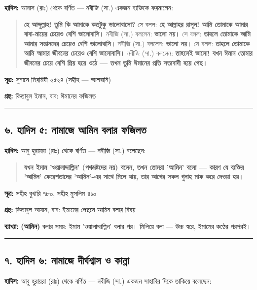 \textbf{হাদিস:} আনাস (রাঃ) থেকে বর্ণিত — নবীজি (সা.) একজন ব্যক্তিকে ফরমালেন:

\begin{quote}
\textbf{হে আব্দুল্লাহ! তুমি কি আমাকে কতটুকু ভালোবাসো?} সে বলল: \textbf{হে আল্লাহর রাসূল! আমি তোমাকে আমার বাবা-মায়ের চেয়েও বেশি ভালোবাসি।} নবীজি (সা.) বললেন: \textbf{ভালো নয়।} সে বলল: \textbf{তাহলে তোমাকে আমি আমার সন্তানদের চেয়েও বেশি ভালোবাসি।} নবীজি (সা.) বললেন: \textbf{ভালো নয়।} সে বলল: \textbf{তাহলে তোমাকে আমি আমার জীবনের চেয়েও বেশি ভালোবাসি।} নবীজি (সা.) বললেন: \textbf{তাহলেই ভালো! যখন ঈমান তোমার জীবনের চেয়ে বেশি প্রিয় হয়ে ওঠে — তখন তুমি ঈমানের প্রতি সত্যবাদী হয়ে গেছ।}
\end{quote}

\textbf{সূত্র:} সুনানে তিরমিযী ২৫২৪ (সহীহ — আলবানি)

\textbf{গ্রন্থ:} কিতাবুল ইমান, বাব: ঈমানের ফজিলত

\medskip\hrule\medskip

\subsection*{৬. হাদিস ৫: নামাজে আমিন বলার ফজিলত}

\textbf{হাদিস:} আবু হুরায়রা (রাঃ) থেকে বর্ণিত — নবীজি (সা.) বলেছেন:

\begin{quote}
\textbf{যখন ইমাম 'ওয়ালাদ্দাল্লিন' (পথভ্রষ্টদের নয়) বলেন, তখন তোমরা 'আমিন' বলো — কারণ যে ব্যক্তির 'আমিন' ফেরেশতাদের 'আমিন'-এর সাথে মিলে যায়, তার আগের সকল গুনাহ মাফ করে দেওয়া হয়।}
\end{quote}

\textbf{সূত্র:} সহীহ বুখারি ৭৮০, সহীহ মুসলিম ৪১০

\textbf{গ্রন্থ:} কিতাবুল আযান, বাব: ইমামের পেছনে আমিন বলার বিষয়

\textbf{ব্যাখ্যা:} \textbf{ (আমিন)} বলার সময়: ইমাম 'ওয়ালাদ্দাল্লিন' বলার পর। মিলিয়ে বলা — উচ্চ স্বরে, ইমামের কণ্ঠের পরপরই।

\medskip\hrule\medskip

\subsection*{৭. হাদিস ৬: নামাজে দীর্ঘশ্বাস ও কান্না}

\textbf{হাদিস:} আবু হুরায়রা (রাঃ) থেকে বর্ণিত — নবীজি (সা.) একজন সাহাবির দিকে তাকিয়ে বলেছেন:

